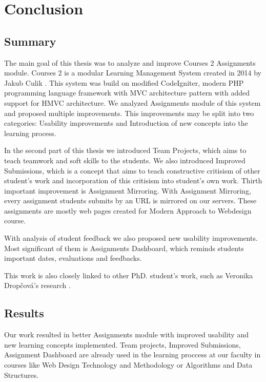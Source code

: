 \chapter*{Conclusion}

\section*{Summary}

The main goal of this thesis was to analyze and improve Courses 2 Assignments module. Courses 2 is a modular Learning Management System created in 2014 by Jakub Culik \cite{culik}. This system was build on modified CodeIgniter, modern PHP programming language framework with MVC architecture pattern with added support for HMVC architecture. We analyzed Assignments module of this system and proposed multiple improvements. This improvements may be split into two categories: Usability improvements and Introduction of new concepts into the learning process.

In the second part of this thesis we introduced Team Projects, which aims to teach teamwork and soft skills to the students. We also introduced Improved Submissions, which is a concept that aims to teach constructive critisism of other student's work and incorporation of this critisism into student's own work. Thirth important improvement is Assignment Mirroring. With Assignment Mirroring, every assignment students submits by an URL is mirrored on our servers. These assignments are mostly web pages created for Modern Approach to Webdesign course.


With analysis of student feedback we also proposed new usability improvements. Most significant of them is Assignments Dashboard, which reminds students important dates, evaluations and feedbacks.

This work is also closely linked to other PhD. student's work, such as Veronika Drop\v{c}ov\'{a}'s research \cite{dropcova}.

\section*{Results}
Our work resulted in better Assignments module with improved usability and new learning concepts implemented. Team projects, Improved Submissions, Assignment Dashboard are already used in the learning proccess at our faculty in courses like Web Design Technology and Methodology or Algorithms and Data Structures.

